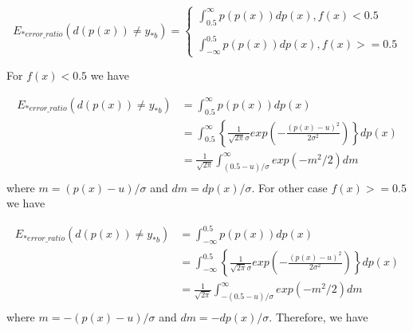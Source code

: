 \documentclass[runningheads,openany]{xhlPaper}
\begin{document}
\begin{displaymath}
E_{*error\_ratio}\left ( d\left ( p\left ( x \right ) \right ) \neq y_{*b}\right ) = \left\{\begin{array}{*{20}{l}}
\int_{0.5}^{\infty}p\left ( p\left ( x \right ) \right )dp\left ( x \right ), f\left ( x \right ) < 0.5\\
\\
\int_{-\infty}^{0.5}p\left ( p\left ( x \right ) \right )dp\left ( x \right ), f\left ( x \right ) >= 0.5
\end{array}\right.
\end{displaymath}

For $f\left(x\right) < 0.5$ we have

\begin{displaymath}
\begin{aligned}
E_{*error\_ratio}\left ( d\left ( p\left ( x \right ) \right ) \neq y_{*b}\right ) &= \int_{0.5}^{\infty}p\left ( p\left ( x \right ) \right )dp\left ( x \right )\\
&=\int_{0.5}^{\infty}\left \{ \frac{1}{\sqrt{2 \pi}\sigma }exp\left ( -\frac{\left ( p\left(x\right) - u \right )^2}{2\sigma ^2} \right ) \right \}dp\left ( x \right )\\
&=\frac{1}{\sqrt{2 \pi} }\int_{\left ( 0.5 - u \right ) / \sigma }^{\infty}exp\left ( -m^2 / {2} \right ) dm\\
\end{aligned}
\end{displaymath}
where $m = \left ( p\left ( x \right ) - u\right ) / \sigma$ and $dm = dp\left ( x \right ) / \sigma$. For other case $f\left(x\right) >= 0.5$ we have

\begin{displaymath}
\begin{aligned}
E_{*error\_ratio}\left ( d\left ( p\left ( x \right ) \right ) \neq y_{*b}\right ) &= \int_{-\infty}^{0.5}p\left ( p\left ( x \right ) \right )dp\left ( x \right )\\
&=\int_{-\infty}^{0.5}\left \{ \frac{1}{\sqrt{2 \pi}\sigma }exp\left ( -\frac{\left ( p\left(x\right) - u \right )^2}{2\sigma ^2} \right ) \right \}dp\left ( x \right )\\
&=\frac{1}{\sqrt{2 \pi} }\int_{-\left ( 0.5 - u \right ) / \sigma }^{\infty}exp\left ( -m^2 / {2} \right ) dm\\
\end{aligned}
\end{displaymath}
where $m = -\left ( p\left ( x \right ) - u\right ) / \sigma$ and $dm = -dp\left ( x \right ) / \sigma$. Therefore, we have
\end{document}
